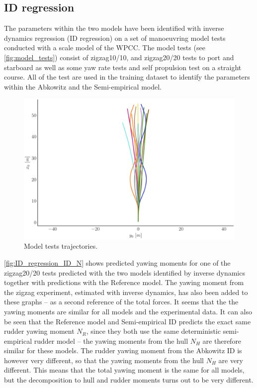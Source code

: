 \subsection{ID regression}
\label{sec:result_ID_regression}
The parameters within the two models have been identified with inverse dynamics regression (ID regression) on a set of manoeuvring model tests conducted with a scale model of the WPCC. The model tests (see \autoref{fig:model_tests}) consist of zigzag10/10, and zigzag20/20 tests to port and starboard as well as some yaw rate tests and self propulsion test on a straight course. All of the test are used in the training dataset to identify the parameters within the Abkowitz and the Semi-empirical model.
\begin{figure}[h!]
    \includegraphics[width=\columnwidth]{figures/result_ID_regression.model_tests.pdf}
    \caption{Model tests trajectories.}
    \label{fig:model_tests}
\end{figure}
\autoref{fig:ID_regression_ID_N} shows predicted yawing moments for one of the zigzag20/20 tests predicted with the two models identified by inverse dynamics together with predictions with the Reference model. The yawing moment from the zigzag experiment, estimated with inverse dynamics, has also been added to these graphs -- as a second reference of the total forces. It seems that the the yawing moments are similar for all models and the experimental data. It can also be seen that the Reference model and Semi-empirical ID predicts the exact same rudder yawing moment $N_R$, since they both use the same deterministic semi-empirical rudder model -- the yawing moments from the hull $N_H$ are therefore similar for these models. The rudder yawing moment from the Abkowitz ID is however very different, so that the yawing moments from the hull $N_H$ are very different. This means that the total yawing moment is the same for all models, but the decomposition to hull and rudder moments turns out to be very different.
